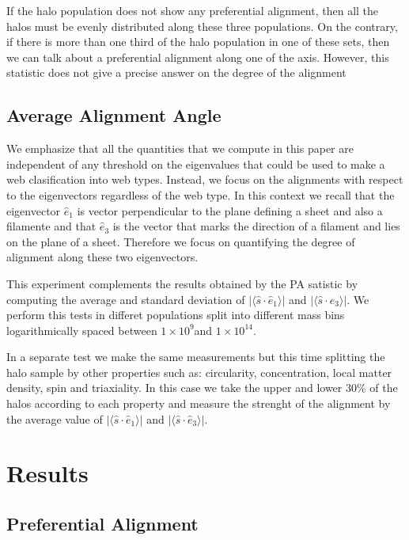 \documentclass[useAMS,usenatbib]{mn2e}
\newcommand{\hMsun}{{\ifmmode{h^{-1}{\rm
        {M_{\odot}}}}\else{$h^{-1}{\rm{M_{\odot}}}$~}\fi}}
\begin{document}
If the halo population does not show any preferential alignment, then
all the halos must be evenly distributed along these three
populations. On the contrary, if there is more than one third of the
halo population in one of these sets, then we can talk about a
preferential alignment along one of the axis. However, this statistic 
does not give a precise answer on the degree of the alignment


\subsection{Average Alignment Angle}

We emphasize that all the quantities that we compute in this paper are
independent of any threshold on the eigenvalues that could be used to make a web
clasification into web types. Instead, we focus on the alignments with
respect to the eigenvectors regardless of the web type. In this
context we recall that the eigenvector $\hat{e}_1$ is vector
perpendicular to the plane defining a sheet and also a filamente and
that $\hat{e}_3$ is the vector that marks the direction of a filament
and lies on the plane of a sheet. Therefore we focus on quantifying
the degree of alignment along these two eigenvectors. 

This experiment complements the results obtained by the PA satistic by
computing the average and standard deviation of
$\vert\langle\hat{s}\cdot\hat{e}_1\rangle\vert$ and
$\vert\langle\hat{s}\cdot\hat{e}_3\rangle\vert$.  We perform this
tests in differet populations split into different mass bins
logarithmically spaced between $1\times 10^{9}$\hMsun and
$1\times10^{14}$\hMsun.  

In a separate test we make the same measurements but this time
splitting the halo sample by other properties such as:
circularity, concentration, local matter density, spin and
triaxiality. In this case we take the upper and lower $30\%$ of the
halos according to each property and measure the strenght of the
alignment by the average value of
$\vert\langle\hat{s}\cdot\hat{e}_1\rangle\vert$ and
$\vert\langle\hat{s}\cdot\hat{e}_3\rangle\vert$. 

\section{Results}
\label{sec:results}


\subsection{Preferential Alignment}
\end{document}

